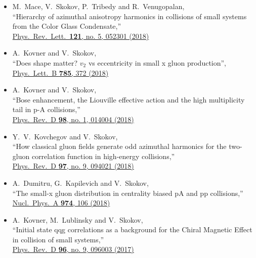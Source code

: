 \begin{itemize}
	\setlength\itemsep{0.25em}	
	\item[]  
		M.~Mace, V.~Skokov, P.~Tribedy and R.~Venugopalan, \\
  ``Hierarchy of azimuthal anisotropy harmonics in collisions of small systems from the Color Glass Condensate,'' \\
  \href{http://dx.doi.org/10.1103/PhysRevLett.121.052301}{
	  Phys.\ Rev.\ Lett.\  {\bf 121}, no. 5, 052301 (2018)}

  \item[]
		A.~Kovner and V.~Skokov, \\
	   ``Does shape matter? $v_2$ vs eccentricity in small x gluon production'', \\ 
	   \href{https://doi.org/10.1016/j.physletb.2018.09.001}{
 	Phys.\ Lett.\ B {\bf 785}, 372 (2018)}


	\item[]   
		A.~Kovner and V.~Skokov, \\
  ``Bose enhancement, the Liouville effective action and the high multiplicity tail in p-A collisions,'' \\
  \href{http://dx.doi.org/10.1103/PhysRevD.98.014004}{ 
  Phys.\ Rev.\ D {\bf 98}, no. 1, 014004 (2018)}

	\item[]   
		Y.~V.~Kovchegov and V.~Skokov, \\
  ``How classical gluon fields generate odd azimuthal harmonics for the two-gluon correlation function in high-energy collisions,'' \\
  \href{http://dx.doi.org/doi:10.1103/PhysRevD.97.094021}  {
	  Phys.\ Rev.\ D {\bf 97}, no. 9, 094021 (2018) }

	\item[]  
		A.~Dumitru, G.~Kapilevich and V.~Skokov,\\
  ``The small-x gluon distribution in centrality biased pA and pp collisions,''\\
  \href{http://dx.doi.org/doi:10.1016/j.nuclphysa.2018.03.012}{
	  Nucl.\ Phys.\ A {\bf 974}, 106 (2018)}


	\item[] 
		A.~Kovner, M.~Lublinsky and V.~Skokov,\\
  ``Initial state qqg correlations as a background for the Chiral Magnetic Effect in collision of small systems,''\\
  \href{http://dx.doi.org/doi:10.1103/PhysRevD.96.096003}{
	  Phys.\ Rev.\ D {\bf 96}, no. 9, 096003 (2017)}


\end{itemize}
